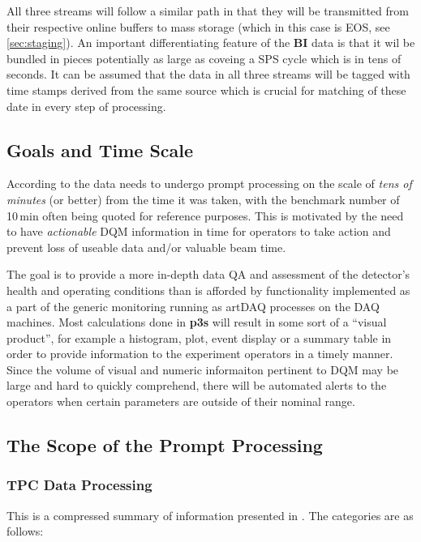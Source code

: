 \documentclass[pdftex,12pt,letter]{article}
\newcommand{\PPS}{\textbf{p3s}\xspace}
\begin{document}
\noindent All three streams will follow a similar path in that they will be transmitted from their respective
online buffers to mass storage (which in this case is EOS, see \ref{sec:staging}). An important differentiating
feature of the \textbf{BI} data is that it wil be bundled in pieces potentially as large as coveing
a SPS cycle which is in tens of seconds. It can be assumed that the data in all three streams will be tagged
with time stamps derived from the same source which is crucial for matching of these date in every step
of processing.

\subsection{Goals and Time Scale}
\label{sec:outline}
According to \cite{docdb1811}  the data needs to undergo prompt processing on the scale
of \textit{tens of minutes} (or better) from the time it was taken, with the benchmark number of
10\,min often being quoted for reference purposes. This is motivated by the need to have
\textit{actionable} DQM information in time for operators to take action and prevent loss
of useable data and/or valuable beam time.

The goal is to provide a more in-depth data QA and assessment of the detector's health and operating
conditions than is afforded by functionality implemented as a part of the generic monitoring running as
artDAQ processes on the DAQ machines. Most calculations done in \PPS
will result in some sort of a ``visual product'', for example a histogram, plot, event display
or a summary table in order to provide information to the experiment operators in a timely manner.
Since the volume of visual and numeric informaiton pertinent to DQM may be large and hard
to quickly comprehend, there will be automated alerts to the operators when certain parameters
are outside of their nominal range.


\subsection{The Scope of the Prompt Processing}
\label{sec:scope}
\subsubsection{TPC Data Processing}
\label{sec:categories}
This is a compressed summary of information presented in \cite{docdb1811}.
The categories are as follows:
\end{document}
